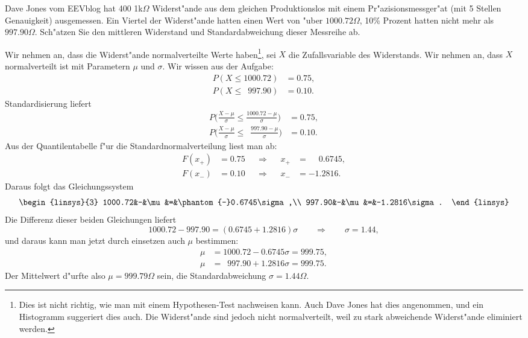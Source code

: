 Dave Jones vom EEVblog hat 400 1k$\Omega$ Widerst"ande aus dem gleichen
Produktionslos mit einem Pr"azisionsmessger"at (mit 5 Stellen
Genauigkeit) ausgemessen. 
Ein Viertel der Widerst"ande hatten einen Wert von "uber $1000.72\Omega$,
10\% Prozent hatten nicht mehr als $997.90\Omega$.
Sch"atzen Sie den mittleren Widerstand und Standardabweichung dieser
Messreihe ab.

\begin{loesung}
Wir nehmen an, dass die Widerst"ande normalverteilte Werte haben\footnote{
Dies ist nicht richtig, wie man mit einem Hypothesen-Test nachweisen kann.
Auch Dave Jones hat dies angenommen, und ein Histogramm suggeriert
dies auch. Die Widerst"ande sind jedoch nicht normalverteilt, weil zu
stark abweichende Widerst"ande eliminiert werden.}, sei $X$ die Zufallsvariable
des Widerstands.
Wir nehmen an, dass $X$ normalverteilt ist mit Parametern $\mu$ und $\sigma$.
Wir wissen aus der Aufgabe:
\begin{equation}
\begin{aligned}
P(X\le 1000.72)&=0.75,
\\
P(X\le \phantom{0}997.90)&=0.10.
\end{aligned}
\label{60000042:prob}
\end{equation}
Standardisierung liefert
\begin{equation*}
\begin{aligned}
P\biggl(\frac{X-\mu}{\sigma}\le \frac{1000.72-\mu}{\sigma}\biggr)&=0.75,
\\
P\biggl(\frac{X-\mu}{\sigma}\le \phantom{0}\frac{997.90-\mu}{\sigma}\biggr)&=0.10.
\end{aligned}
\end{equation*}
Aus der Quantilentabelle f"ur die Standardnormalverteilung liest man ab:
\[
\begin{aligned}
F(x_+)&=0.75&&\Rightarrow&&x_+&=\phantom{-}0.6745,\\
F(x_-)&=0.10&&\Rightarrow&&x_-&=-1.2816.
\end{aligned}
\]
Daraus folgt das Gleichungssystem
\[
\begin{linsys}{3}
1000.72&-&\mu&=&\phantom{-}0.6745\sigma,\\
 997.90&-&\mu&=&-1.2816\sigma.
\end{linsys}
\]
Die Differenz dieser beiden Gleichungen liefert
\[
1000.72-997.90 = (0.6745 + 1.2816)\sigma
\qquad
\Rightarrow
\qquad
\sigma = 1.44,
\]
und daraus kann man jetzt durch einsetzen auch $\mu$ bestimmen:
\begin{align*}
\mu&=1000.72-0.6745\sigma=999.75,\\
\mu&=\phantom{0}997.90+1.2816\sigma=999.75.
\end{align*}
Der Mittelwert d"urfte also $\mu=999.79\Omega$ sein, die Standardabweichung
$\sigma=1.44\Omega$.
\end{loesung}

